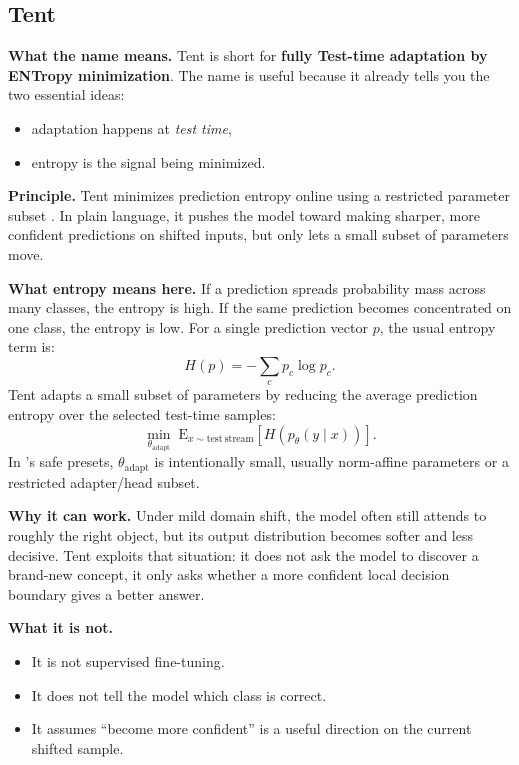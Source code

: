 \subsection{Tent}
\textbf{What the name means.}
Tent is short for \textbf{fully Test-time adaptation by ENTropy minimization}.
The name is useful because it already tells you the two essential ideas:
\begin{itemize}
  \item adaptation happens at \emph{test time},
  \item entropy is the signal being minimized.
\end{itemize}

\textbf{Principle.}
Tent minimizes prediction entropy online using a restricted parameter subset \cite{wang2021tent}. In plain language, it pushes the model toward making sharper, more confident predictions on shifted inputs, but only lets a small subset of parameters move.

\textbf{What entropy means here.}
If a prediction spreads probability mass across many classes, the entropy is high.
If the same prediction becomes concentrated on one class, the entropy is low.
For a single prediction vector $p$, the usual entropy term is:
\[
H(p) = - \sum_c p_c \log p_c.
\]
Tent adapts a small subset of parameters by reducing the average prediction entropy over the selected test-time samples:
\[
\min_{\theta_{\mathrm{adapt}}} \; \mathrm{E}_{x \sim \mathrm{test\ stream}} \left[ H\!\left(p_{\theta}(y \mid x)\right) \right].
\]
In \yolozu{}'s safe presets, $\theta_{\mathrm{adapt}}$ is intentionally small, usually norm-affine parameters or a restricted adapter/head subset.

\textbf{Why it can work.}
Under mild domain shift, the model often still attends to roughly the right object, but its output distribution becomes softer and less decisive.
Tent exploits that situation: it does not ask the model to discover a brand-new concept, it only asks whether a more confident local decision boundary gives a better answer.

\textbf{What it is not.}
\begin{itemize}
  \item It is not supervised fine-tuning.
  \item It does not tell the model which class is correct.
  \item It assumes ``become more confident'' is a useful direction on the current shifted sample.
\end{itemize}

